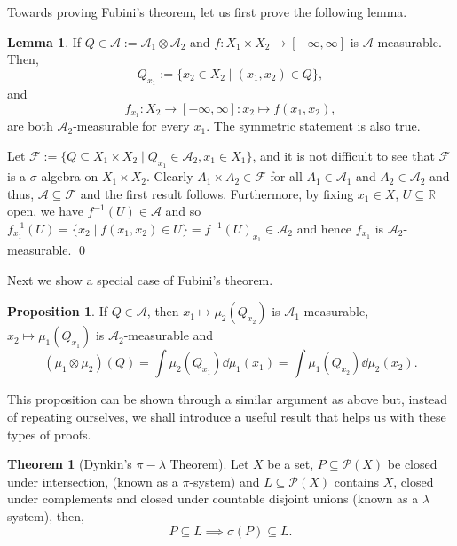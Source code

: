 \documentclass[
]{article}
\theoremstyle{definition}
\newtheorem{theorem}{Theorem}
\newtheorem{prop}{Proposition}
\theoremstyle{definition}
\newtheorem{lemma}{Lemma}[section]
\begin{document}
Towards proving Fubini's theorem, let us first prove the following
lemma.

\begin{lemma}
  If \(Q \in \mathcal{A} := \mathcal{A}_1 \otimes \mathcal{A}_2\) and 
  \(f : X_1 \times X_2 \to [-\infty, \infty]\) is \(\mathcal{A}\)-measurable. Then, 
  \[Q_{x_1} := \{x_2 \in X_2 \mid (x_1, x_2) \in Q\},\]
  and 
  \[f_{x_1} : X_2 \to [-\infty, \infty] : x_2 \mapsto f(x_1, x_2),\]
  are both \(\mathcal{A}_2\)-measurable for every \(x_1\). The symmetric statement 
  is also true.
\end{lemma}
\proof

Let
\(\mathcal{F} := \{Q \subseteq X_1 \times X_2 \mid Q_{x_1} \in \mathcal{A}_2, x_1 \in X_1\}\),
and it is not difficult to see that \(\mathcal{F}\) is a
\(\sigma\)-algebra on \(X_1 \times X_2\). Clearly
\(A_1 \times A_2 \in \mathcal{F}\) for all \(A_1 \in \mathcal{A}_1\) and
\(A_2 \in \mathcal{A}_2\) and thus,
\(\mathcal{A} \subseteq \mathcal{F}\) and the first result follows.
Furthermore, by fixing \(x_1 \in X\), \(U \subseteq \mathbb{R}\) open,
we have \(f^{-1}(U) \in \mathcal{A}\) and so
\(f_{x_1}^{-1}(U) = \{x_2 \mid f(x_1, x_2) \in U\}  = f^{-1}(U)_{x_1} \in \mathcal{A}_2\)
and hence \(f_{x_1}\) is \(\mathcal{A}_2\)-measurable. \qed

Next we show a special case of Fubini's theorem.

\begin{prop}\label{spe_fubini}
  If \(Q \in \mathcal{A}\), then \(x_1 \mapsto \mu_2(Q_{x_2})\) is 
  \(\mathcal{A}_1\)-measurable, \(x_2 \mapsto \mu_1(Q_{x_1})\) is 
  \(\mathcal{A}_2\)-measurable and 
  \[(\mu_1 \otimes \mu_2)(Q) = \int \mu_2(Q_{x_1}) \dd \mu_1(x_1) =  
    \int \mu_1(Q_{x_2}) \dd \mu_2(x_2).\]
\end{prop}

This proposition can be shown through a similar argument as above but,
instead of repeating ourselves, we shall introduce a useful result that
helps us with these types of proofs.

\begin{theorem}[Dynkin's \(\pi-\lambda\) Theorem]
  Let \(X\) be a set, \(P \subseteq \mathcal{P}(X)\) be closed under intersection, 
  (known as a \(\pi\)-system) and \(L \subseteq \mathcal{P}(X)\) contains 
  \(X\), closed under complements and closed under countable disjoint 
  unions (known as a \(\lambda\) system), then,
  \[P \subseteq L \implies \sigma(P) \subseteq L.\] 
\end{theorem}
\proof
\end{document}
